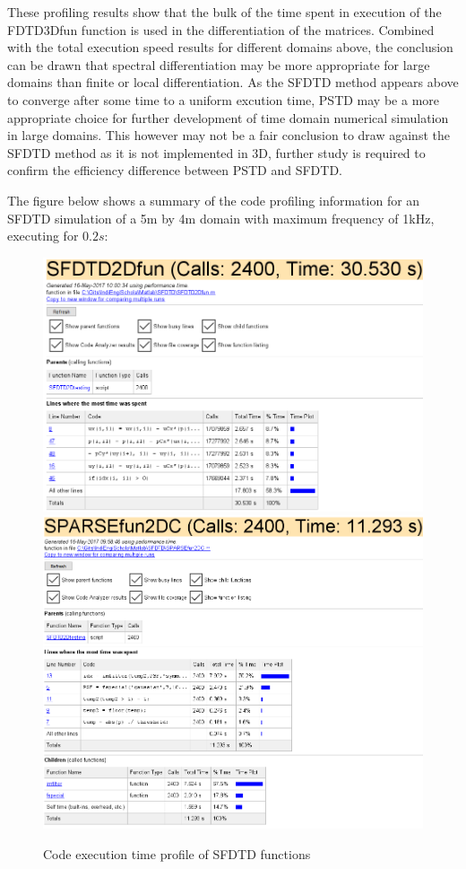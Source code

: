 These profiling results show that the bulk of the time spent in execution of the FDTD3Dfun function is used in the differentiation of the matrices. Combined with the total execution speed results for different domains above, the conclusion can be drawn that spectral differentiation may be more appropriate for large domains than finite or local differentiation. As the SFDTD method appears above to converge after some time to a uniform excution time, PSTD may be a more appropriate choice for further development of time domain numerical simulation in large domains. This however may not be a fair conclusion to draw against the SFDTD method as it is not implemented in 3D, further study is required to confirm the efficiency difference between PSTD and SFDTD.

The figure below shows a summary of the code profiling information for an SFDTD simulation of a 5m by 4m domain with maximum frequency of 1kHz, executing for $0.2s$:\\
\begin{figure}[H]
\centering
  \includegraphics[width=1\textwidth]{./graphics/sfdtdfunprosum.png}
  \includegraphics[width=1\textwidth]{./graphics/sparfunprosum.png}
  \caption{Code execution time profile of SFDTD functions}
\end{figure}
